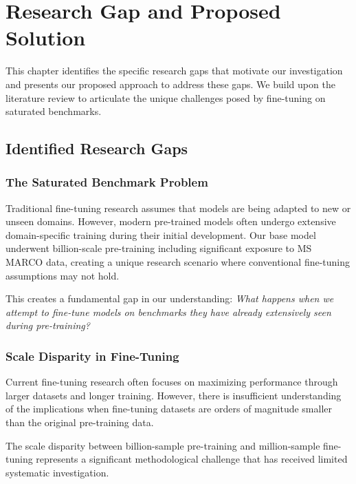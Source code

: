 
\chapter{Research Gap and Proposed Solution} %

\label{Chapter3} %


This chapter identifies the specific research gaps that motivate our investigation and presents our proposed approach to address these gaps. We build upon the literature review to articulate the unique challenges posed by fine-tuning on saturated benchmarks.

\section{Identified Research Gaps}

\subsection{The Saturated Benchmark Problem}

Traditional fine-tuning research assumes that models are being adapted to new or unseen domains. However, modern pre-trained models often undergo extensive domain-specific training during their initial development. Our base model underwent billion-scale pre-training including significant exposure to MS MARCO data, creating a unique research scenario where conventional fine-tuning assumptions may not hold.

This creates a fundamental gap in our understanding: \textit{What happens when we attempt to fine-tune models on benchmarks they have already extensively seen during pre-training?}

\subsection{Scale Disparity in Fine-Tuning}

Current fine-tuning research often focuses on maximizing performance through larger datasets and longer training. However, there is insufficient understanding of the implications when fine-tuning datasets are orders of magnitude smaller than the original pre-training data.

The scale disparity between billion-sample pre-training and million-sample fine-tuning represents a significant methodological challenge that has received limited systematic investigation.


